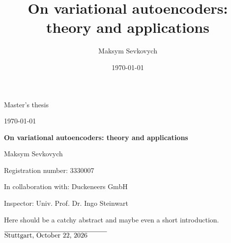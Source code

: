 \documentclass[12pt, a4paper]{scrreprt}
\title{On variational autoencoders: theory and applications}
\date{\today}
\author{Maksym Sevkovych}
\theoremstyle{plain}
\theoremstyle{definition}
\theoremstyle{plain}
\begin{document}
\begin{titlepage}
\vspace*{1 cm}
\begin{center}
\LARGE{Master's thesis}

\vspace{0.5 cm}

\large{\today}

\vspace{0.5 cm}

\Huge{\textbf{On variational autoencoders: theory and applications}}

\vspace{0.5 cm}

\Large{Maksym Sevkovych}

\Large{Registration number: 3330007}

\Large{In collaboration with: Duckeneers GmbH}
\vspace{1 cm}

\Large{Inspector: Univ. Prof. Dr. Ingo Steinwart}
\vspace{3cm}
\end{center}
Here should be a catchy abstract and maybe even a short introduction.
\end{titlepage}
\newpage
\tableofcontents



\iffalse


\fi



\vspace{4 cm}

$\overline{\text{Stuttgart, \today} \hspace{1 cm}}$
\end{document}
